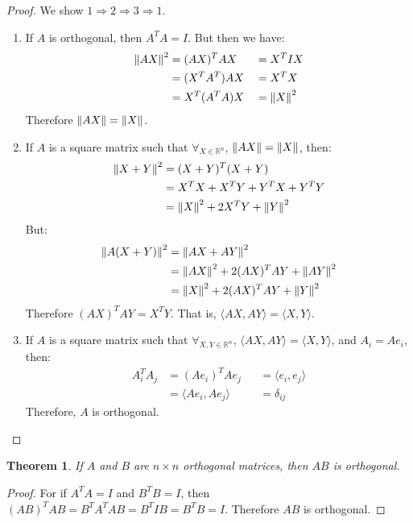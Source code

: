 \documentclass{article}
\theoremstyle{mystyle}
\newtheorem{theorem}{Theorem}[section]
\begin{document}
\begin{proof}
We show $1\Rightarrow 2 \Rightarrow 3 \Rightarrow 1$.
\begin{enumerate}
\item If $A$ is orthogonal, then $A^TA = I$. But then we have:
        \begin{align*}
            \norm{AX}^{2} &= (AX)^{T}AX & &= X^{T}IX\\ 
            &= (X^{T}A^{T})AX & &= X^{T}X\\ 
            &= X^{T}(A^{T}A)X & &= \norm{X}^{2}
        \end{align*}
    Therefore $\norm{AX} = \norm{X}$.
\item If $A$ is a square matrix such that $\forall_{X\in\mathbb{R}^{n}}$, $\norm{AX} = \norm{X}$, then:
    \begin{align*}
        \norm{X+Y}^{2} &= (X+Y)^T(X+Y)\\
        &= X^TX+X^TY+Y^TX+Y^TY\\
        &= \norm{X}^2+2X^TY+\norm{Y}^2
    \end{align*}
    But:
    \begin{align*}
        \norm{A(X+Y)}^{2} &= \norm{AX+AY}^{2}\\
        &= \norm{AX}^{2}+2(AX)^{T}AY+\norm{AY}^2\\
        &= \norm{X}^{2}+2(AX)^{T}AY+\norm{Y}^2
    \end{align*}
    Therefore $(AX)^TAY = X^TY$. That is, $\langle AX, AY\rangle = \langle X, Y\rangle$.
    \item If $A$ is a square matrix such that $\forall_{X,Y\in \mathbb{R}^n}$, $\langle AX, AY\rangle = \langle X, Y\rangle$, and $A_i =  Ae_i$, then:
        \begin{align*}
            A_{i}^{T}A_{j} &= (Ae_{i})^{T}Ae_{j} & &= \langle e_i, e_j\rangle\\
            &= \langle Ae_{i}, Ae_{j}\rangle & &= \delta_{ij}
        \end{align*}
        Therefore, $A$ is orthogonal.
\end{enumerate}
\end{proof}
\begin{theorem}
If $A$ and $B$ are $n\times n$ orthogonal matrices, then $AB$ is orthogonal.
\end{theorem}
\begin{proof}
For if $A^{T}A = I$ and $B^{T}B = I$, then $(AB)^{T}AB = B^{T}A^{T}AB = B^{T}IB = B^{T}B = I$. Therefore $AB$ is orthogonal.
\end{proof}
\end{document}
